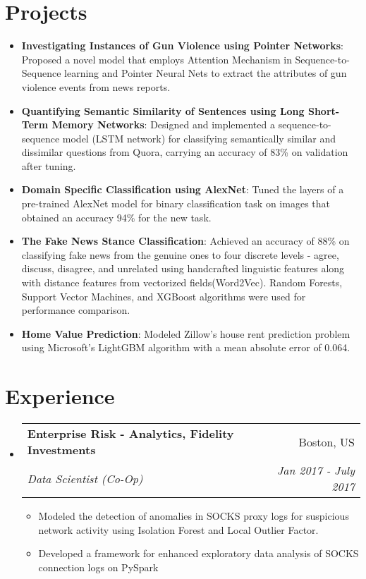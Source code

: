 \documentclass[letterpaper,10pt]{article}
\makeatletter
\newcommand{\resumeItem}[2]{
  \item\small{
    \textbf{#1}{: #2 \vspace{-2pt}}
  }
}
\newcommand{\resumeBullet}[2]{
  \item\small{
    \textbf{#1}{#2 \vspace{-2pt}}
  }
}
\newcommand{\resumeSubheading}[4]{
  \vspace{-1pt}\item
    \begin{tabular*}{0.97\textwidth}{l@{\extracolsep{\fill}}r}
      \textbf{#1} & #2 \\
      \textit{\small#3} & \textit{\small #4} \\
    \end{tabular*}\vspace{-5pt}
}
\newcommand{\resumeSubItem}[2]{\resumeItem{#1}{#2}\vspace{-4pt}}
\newcommand{\resumeJobFunc}[2]{\resumeBullet{#1}{#2}\vspace{-0pt}}
\newcommand{\resumeSubHeadingListStart}{\begin{itemize}[leftmargin=*]}
\newcommand{\resumeSubHeadingListEnd}{\end{itemize}}
\newcommand{\resumeItemListStart}{\begin{itemize}}
\newcommand{\resumeItemListEnd}{\end{itemize}\vspace{-5pt}}
\makeatother
\begin{document}
\section{Projects}
  \resumeSubHeadingListStart
    \resumeSubItem{Investigating Instances of Gun Violence using Pointer Networks}
      {Proposed a novel model that employs Attention Mechanism in Sequence-to-Sequence learning and Pointer Neural Nets to extract the attributes of gun violence events from news reports.}
    \resumeSubItem{Quantifying Semantic Similarity of Sentences using Long Short-Term Memory Networks}
      {Designed and implemented a sequence-to-sequence model (LSTM network) for classifying semantically similar and dissimilar questions from Quora, carrying an accuracy of 83\% on validation after tuning.}
    \resumeSubItem{Domain Specific Classification using AlexNet}
      {Tuned the layers of a pre-trained AlexNet model for binary classification task on images that obtained an accuracy 94\% for the new task.}
    \resumeSubItem{The Fake News Stance Classification}
    {Achieved an accuracy of 88\% on classifying fake news from the genuine ones to four discrete levels - agree, discuss, disagree, and unrelated using handcrafted linguistic features along with distance features from vectorized fields(Word2Vec). Random Forests, Support Vector Machines, and XGBoost algorithms were used for performance comparison.}
    \resumeSubItem{Home Value Prediction}
    {Modeled Zillow's house rent prediction problem using Microsoft's LightGBM algorithm with a mean absolute error of 0.064.}

  \resumeSubHeadingListEnd
      
  

\section{Experience}

\resumeSubHeadingListStart

    \resumeSubheading
      {Enterprise Risk - Analytics, Fidelity Investments}{Boston, US}
      {Data Scientist (Co-Op)}{Jan 2017 - July 2017}
      \resumeItemListStart
      \resumeJobFunc{}{Modeled the detection of anomalies in SOCKS proxy logs for suspicious network activity using Isolation Forest and Local Outlier Factor.}
      \resumeJobFunc{}{Developed a framework for enhanced exploratory data analysis of SOCKS connection logs on PySpark}
      \resumeItemListEnd
      \resumeSubHeadingListEnd
      
\end{document}
